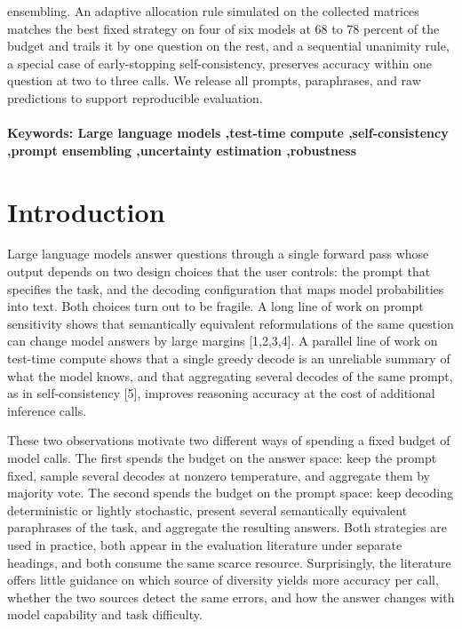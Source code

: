 \documentclass[preprint,12pt]{elsarticle}
\begin{document}
ensembling. An adaptive allocation rule simulated on the collected matrices matches the best fixed strategy on four of six models at 68 to 78 percent of the budget and trails it by one question on the rest, and a sequential unanimity rule, a special case of early-stopping self-consistency, preserves accuracy within one question at two to three calls. We release all prompts, paraphrases, and raw predictions to support reproducible evaluation.


\paragraph{Keywords: Large language models \sep test-time compute \sep self-consistency \sep prompt ensembling \sep uncertainty estimation \sep robustness}



\section{Introduction}


Large language models answer questions through a single forward pass whose output depends on two design choices that the user controls: the prompt that specifies the task, and the decoding configuration that maps model probabilities into text. Both choices turn out to be fragile. A long line of work on prompt sensitivity shows that semantically equivalent reformulations of the same question can change model answers by large margins [1,2,3,4]. A parallel line of work on test-time compute shows that a single greedy decode is an unreliable summary of what the model knows, and that aggregating several decodes of the same prompt, as in self-consistency [5], improves reasoning accuracy at the cost of additional inference calls.

These two observations motivate two different ways of spending a fixed budget of model calls. The first spends the budget on the answer space: keep the prompt fixed, sample several decodes at nonzero temperature, and aggregate them by majority vote. The second spends the budget on the prompt space: keep decoding deterministic or lightly stochastic, present several semantically equivalent paraphrases of the task, and aggregate the resulting answers. Both strategies are used in practice, both appear in the evaluation literature under separate headings, and both consume the same scarce resource. Surprisingly, the literature offers little guidance on which source of diversity yields more accuracy per call, whether the two sources detect the same errors, and how the answer changes with model capability and task difficulty.
\end{document}
